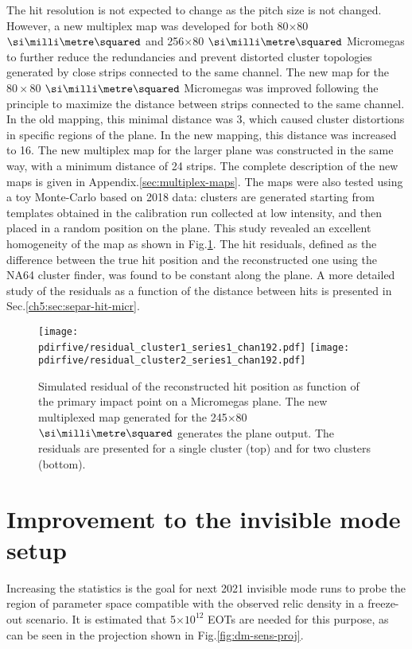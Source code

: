 The hit resolution is not expected to change as the pitch size is not changed. However, a new multiplex map was developed for both 80$\times$80 $\mms$ and 256$\times$80 $\mms$ Micromegas to further reduce the redundancies and prevent distorted cluster topologies generated by close strips connected to the same channel. The new map for the $80\times80$ $\mms$ Micromegas was improved following the principle to maximize the distance between strips connected to the same channel. In the old mapping, this minimal distance was 3, which caused cluster distortions in specific regions of the plane. In the new mapping, this distance was increased to 16. The new multiplex map for the larger plane was constructed in the same way, with a minimum distance of 24 strips. The complete description of the new maps is given in Appendix.\ref{sec:multiplex-maps}. The maps were also tested using a toy Monte-Carlo based on 2018 data: clusters are generated starting from templates obtained in the calibration run collected at low intensity, and then placed in a random position on the plane. This study revealed an excellent homogeneity of the map as shown in Fig.\ref{fig:mm-mult-study}. The hit residuals, defined as the difference between the true hit position and the reconstructed one using the NA64 cluster finder, was found to be constant along the plane. A more detailed study of the residuals as a function of the distance between hits is presented in Sec.\ref{ch5:sec:separ-hit-micr}.

\begin{figure}
    \centering
    \texttt{[image: \\pdirfive/residual\_cluster1\_series1\_chan192.pdf]}
    \texttt{[image: \\pdirfive/residual\_cluster2\_series1\_chan192.pdf]}
    \caption[Test of new multiplex map]{Simulated residual of the reconstructed hit position as function of the primary impact point on a Micromegas plane. The new multiplexed map generated for the 245$\times$80 $\mms$ generates the plane output. The residuals are presented for a single cluster (top) and for two clusters (bottom).}
    \label{fig:mm-mult-study}
\end{figure}


\FloatBarrier\noindent
\section{Improvement to the invisible mode setup}
\label{ch5:sec:new-invismode-setup}

Increasing the statistics is the goal for next 2021 invisible mode runs to probe the region of parameter space compatible with the observed relic density in a freeze-out scenario. It is estimated that 5$\times 10^{12}$ EOTs are needed for this purpose, as can be seen in the projection shown in Fig.\ref{fig:dm-sens-proj}.

